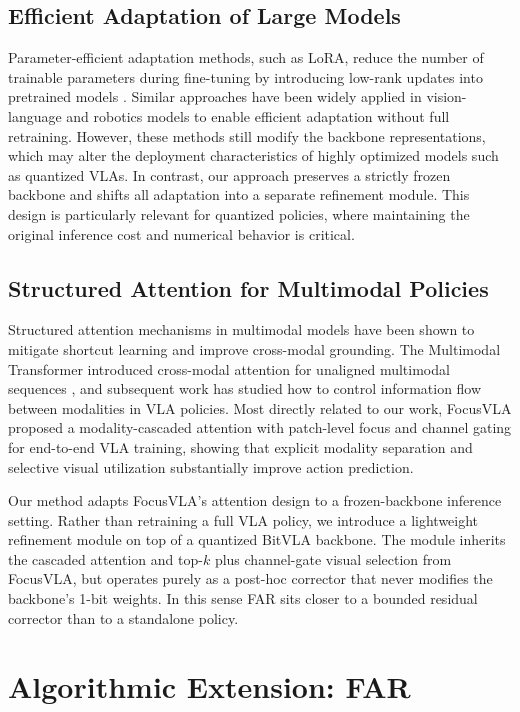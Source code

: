 \documentclass[conference]{IEEEtran}
\begin{document}
\subsection{Efficient Adaptation of Large Models}
Parameter-efficient adaptation methods, such as LoRA, reduce the number of trainable parameters during fine-tuning by introducing low-rank updates into pretrained models \cite{hu2022lora}. Similar approaches have been widely applied in vision-language and robotics models to enable efficient adaptation without full retraining. However, these methods still modify the backbone representations, which may alter the deployment characteristics of highly optimized models such as quantized VLAs.
In contrast, our approach preserves a strictly frozen backbone and shifts all adaptation into a separate refinement module. This design is particularly relevant for quantized policies, where maintaining the original inference cost and numerical behavior is critical.

\subsection{Structured Attention for Multimodal Policies}
Structured attention mechanisms in multimodal models have been shown to mitigate shortcut learning and improve cross-modal grounding. The Multimodal Transformer introduced cross-modal attention for unaligned multimodal sequences \cite{tsai2019multimodal}, and subsequent work has studied how to control information flow between modalities in VLA policies. Most directly related to our work, FocusVLA \cite{zhang2026focusvla} proposed a modality-cascaded attention with patch-level focus and channel gating for end-to-end VLA training, showing that explicit modality separation and selective visual utilization substantially improve action prediction.

Our method adapts FocusVLA's attention design to a frozen-backbone inference setting. Rather than retraining a full VLA policy, we introduce a lightweight refinement module on top of a quantized BitVLA backbone. The module inherits the cascaded attention and top-$k$ plus channel-gate visual selection from FocusVLA, but operates purely as a post-hoc corrector that never modifies the backbone's 1-bit weights. In this sense FAR sits closer to a bounded residual corrector than to a standalone policy.

\section{Algorithmic Extension: FAR}
\end{document}
